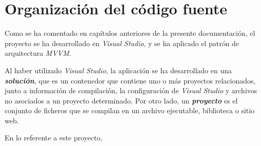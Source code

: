 
\section{Organización del código fuente}
Como se ha comentado en capítulos anteriores de la presente documentación, el proyecto se ha desarrollado en \textit{Visual Studio}, y se ha aplicado el 
patrón de arquitectura \textit{MVVM}. \medskip

Al haber utilizado \textit{Visual Studio}, la aplicación se ha desarrollado en una \textbf{\textit{solución}}, que es un contenedor que contiene 
uno o más proyectos relacionados, junto a información de compilación, la configuración de \textit{Visual Studio} y archivos no asociados 
a un proyecto determinado. Por otro lado, un \textbf{\textit{proyecto}} es el conjunto de ficheros que se compilan en un archivo ejecutable, 
biblioteca o sitio web.

En lo referente a este proyecto, 




